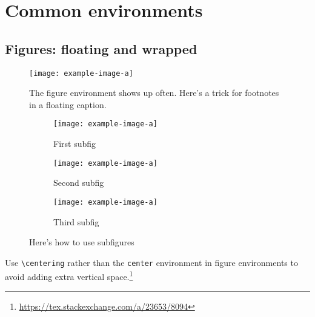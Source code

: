 \section{Common environments}

\subsection{Figures: floating and wrapped}

\begin{figure}%
    \centering
    \texttt{[image: example-image-a]}
    \caption[The figure environment shows up often. Here's a trick for footnotes in a floating caption.]{The figure environment shows up often. Here's a trick for footnotes in a floating caption.\footnotemark
    \label{fig:figure:example}}
\end{figure} 


\begin{figure}%
    \centering
	\begin{subfigure}{0.3\textwidth}
    \centering
        \texttt{[image: example-image-a]}
        \caption{First subfig}
        \label{fig:subfig:1}
    \end{subfigure}\;%
    \begin{subfigure}{0.3\textwidth}
    \centering
        \texttt{[image: example-image-a]}
        \caption{Second subfig}
        \label{fig:subfig:2}
    \end{subfigure}\;%
    \begin{subfigure}{0.3\textwidth}
    \centering
        \texttt{[image: example-image-a]}
        \caption{Third subfig}
        \label{fig:subfig:3}
    \end{subfigure}%
    \caption{Here's how to use subfigures}
    \label{fig:subfigure:example}
\end{figure}

Use 
\verb!\centering!
rather than the \texttt{center} environment in figure environments to avoid adding extra vertical space.\footnote{\url{https://tex.stackexchange.com/a/23653/8094}\label{foot:centering}}

